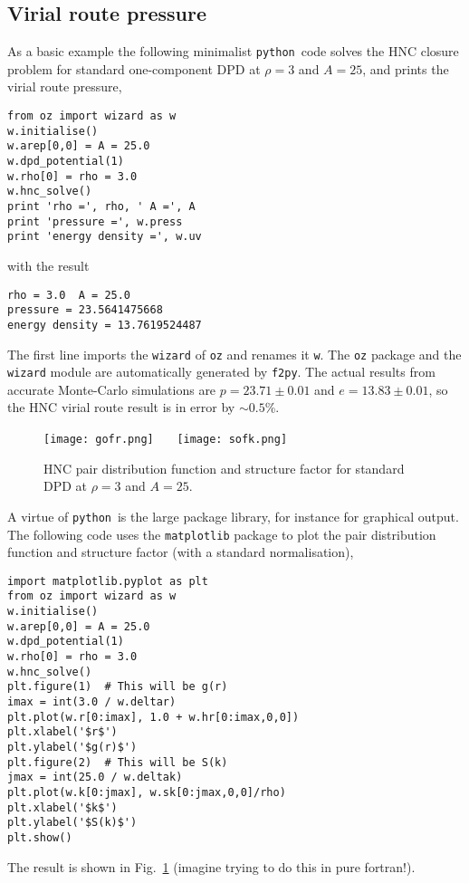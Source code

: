 \documentclass[12pt,a4paper]{article}
\newcommand{\FORTRAN}{{\sc fortran}}
\newcommand{\python}{{\tt python}}
\begin{document}
\subsection{Virial route pressure}
\label{sec:vrp}
%
As a basic example the following minimalist \python\ code solves the
HNC closure problem for standard one-component DPD at $\rho=3$ and
$A=25$, and prints the virial route pressure,
%
\begin{verbatim}
from oz import wizard as w
w.initialise()
w.arep[0,0] = A = 25.0
w.dpd_potential(1)
w.rho[0] = rho = 3.0
w.hnc_solve()
print 'rho =', rho, ' A =', A
print 'pressure =', w.press
print 'energy density =', w.uv
\end{verbatim}
%
with the result
%
\begin{verbatim}
rho = 3.0  A = 25.0
pressure = 23.5641475668
energy density = 13.7619524487
\end{verbatim}
%
The first line imports the \verb+wizard+ of \verb+oz+ and renames it
\verb+w+.  The \verb+oz+ package and the \verb+wizard+ module are
automatically generated by \verb+f2py+.  The actual results from
accurate Monte-Carlo simulations are $p=23.71\pm0.01$ and
$e=13.83\pm0.01$, so the HNC virial route result is in error by
$\sim0.5$\%.

\begin{figure}
\begin{center}
\texttt{[image: gofr.png]}~~~%
\texttt{[image: sofk.png]}
\end{center}
\caption{HNC pair distribution function and structure factor for
  standard DPD at $\rho=3$ and $A=25$.\label{fig:gs}}
\end{figure}

A virtue of \python\ is the large package library, for instance for
graphical output.  The following code uses the \verb+matplotlib+
package to plot the pair distribution function and structure factor
(with a standard normalisation),
%
\begin{verbatim}
import matplotlib.pyplot as plt
from oz import wizard as w
w.initialise()
w.arep[0,0] = A = 25.0
w.dpd_potential(1)
w.rho[0] = rho = 3.0
w.hnc_solve()
plt.figure(1)  # This will be g(r)
imax = int(3.0 / w.deltar)
plt.plot(w.r[0:imax], 1.0 + w.hr[0:imax,0,0])
plt.xlabel('$r$')
plt.ylabel('$g(r)$')
plt.figure(2)  # This will be S(k)
jmax = int(25.0 / w.deltak)
plt.plot(w.k[0:jmax], w.sk[0:jmax,0,0]/rho)
plt.xlabel('$k$')
plt.ylabel('$S(k)$')
plt.show()
\end{verbatim}
%
The result is shown in Fig.~\ref{fig:gs} (imagine trying to do this in
pure \FORTRAN!).
\end{document}
